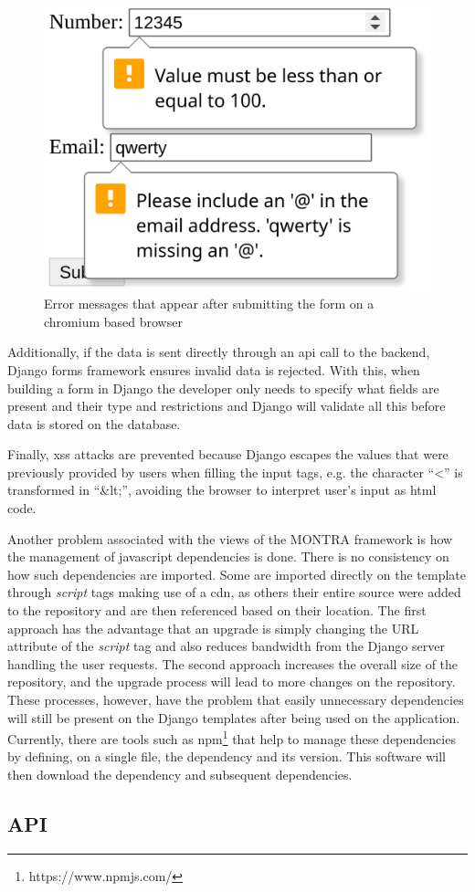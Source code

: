 \begin{figure}
    \center
    \includegraphics[width=.3\textwidth]{html-form-validation}
    \caption{Error messages that appear after submitting the form on a chromium based browser}
    \label{fig:html-form-validation}
\end{figure}

Additionally, if the data is sent directly through an \gls{api} call to the backend, Django forms framework ensures invalid data is rejected.
With this, when building a form in Django the developer only needs to specify what fields are present and their type and restrictions and Django will validate all this before data is stored on the database.

Finally, \gls{xss} attacks are prevented because Django escapes the values that were previously provided by users when filling the input tags, e.g. the character ``<'' is transformed in ``\&lt;'', avoiding the browser to interpret user's input as \gls{html} code.

Another problem associated with the views of the MONTRA framework is how the management of javascript dependencies is done.
There is no consistency on how such dependencies are imported.
Some are imported directly on the template through \textit{script} tags making use of a \gls{cdn}, as others their entire source were added to the repository and are then referenced based on their location.
The first approach has the advantage that an upgrade is simply changing the URL attribute of the \textit{script} tag and also reduces bandwidth from the Django server handling the user requests.
The second approach increases the overall size of the repository, and the upgrade process will lead to more changes on the repository.
These processes, however, have the problem that easily unnecessary dependencies will still be present on the Django templates after being used on the application.
Currently, there are tools such as \gls{npm}\footnote{https://www.npmjs.com/} that help to manage these dependencies by defining, on a single file, the dependency and its version.
This software will then download the dependency and subsequent dependencies.

\subsection*{API}

